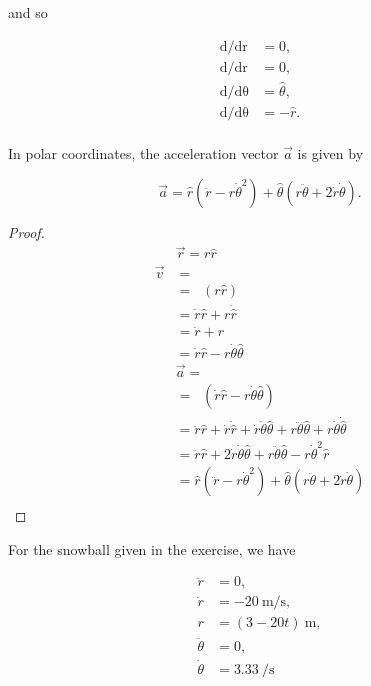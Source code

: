\documentclass{homework}
\begin{document}
and so

\begin{align*}
    \mathop{d\hat{r} / dr} &= 0, \\
    \mathop{d\hat{\theta} / dr} &= 0, \\
    \mathop{d\hat{r} / d\theta} &= \hat{\theta}, \\
    \mathop{d\hat{\theta} / d\theta} &= -\hat{r}. \\
\end{align*}

In polar coordinates, the acceleration vector $\vec{a}$ is given by

\begin{equation*}
    \vec{a} = \hat{r}(\ddot{r} - r\dot{\theta}^2) + \hat{\theta}(r\ddot{\theta} + 2\dot{r}\dot{\theta}).
\end{equation*}

\begin{proof}
\begin{align*}
    &\vec{r} = r\hat{r} \\
    \vec{v} &= \mathop{\frac{d\vec{v}}{dt}} \\
    &= \mathop{\frac{d}{dt}}(r\hat{r}) \\
    &= \dot{r}\hat{r} + r\dot{\hat{r}} \\
    &= \dot{r} + r \mathop{\frac{d\hat{r}}{d\theta}} \mathop{\frac{d\theta}{dt}} \\
    &= \dot{r}\hat{r} - r\dot{\theta}\hat{\theta} \\
    &\vec{a}= \mathop{\frac{d\vec{v}}{dt}} \\
    &= \mathop{\frac{d}{dt}}(\dot{r}\hat{r} - r\dot{\theta}\hat{\theta}) \\
    &= \ddot{r}\hat{r} + \dot{r}\dot{\hat{r}} + \dot{r}\dot{\theta}\hat{\theta} + r\ddot{\theta}\hat{\theta} + r\dot{\theta}\dot{\hat{\theta}} \\
    &= \ddot{r}\hat{r} + 2\dot{r}\dot{\theta}\hat{\theta} + r\ddot{\theta}\hat{\theta} - r\dot{\theta}^2 \hat{r} \\
    &= \hat{r}(\ddot{r} - r\dot{\theta}^2) + \hat{\theta}(r\ddot{\theta} + 2\dot{r}\dot{\theta}) \\
\end{align*}
\end{proof}
For the snowball given in the exercise, we have 

\begin{align*}
    \ddot{r} &= 0, \\
    \dot{r} &= \SI{-20}{\meter\per\second}, \\
    r &= (3 - 20t)\SI{}{\meter}, \\
    \ddot{\theta} &= 0, \\
    \dot{\theta} &= \SI{3.33}{\per\second} \\
\end{align*}
\end{document}
